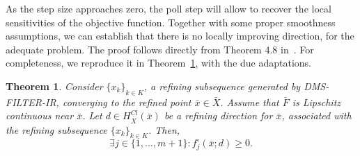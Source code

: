 \documentclass[12pt]{article}
\newtheorem{theorem}{Theorem}[section]
\newcommand{\set}[1]{\{#1\}}
\begin{document}
As the step size approaches zero, the poll step will allow to
recover the local sensitivities of the objective function.
Together with some proper smoothness assumptions, we can establish
that there is no locally improving direction, for the adequate
problem. The proof follows directly from Theorem 4.8
in~\cite{custodio2011}. For completeness, we reproduce it in
Theorem~\ref{teo_opt_f}, with the due adaptations.
\begin{theorem}
\label{teo_opt_f} Consider $\{x_k\}_{k\in K}$, a refining
subsequence generated by DMS-FILTER-IR, converging to the refined
point $\bar{x}\in \bar{X}$. Assume that $\bar{F}$ is Lipschitz
continuous near $\bar{x}$. Let $d\in H^{Cl}_{\bar{X}}(\bar{x})$ be
a refining direction for $\bar{x}$, associated with the refining
subsequence $\{x_k\}_{k\in K}$. Then,
$$\exists j\in\set{1,\ldots,m+1}: f_j^\circ(\bar{x};d)\geq
0.$$
\end{theorem}
\end{document}

